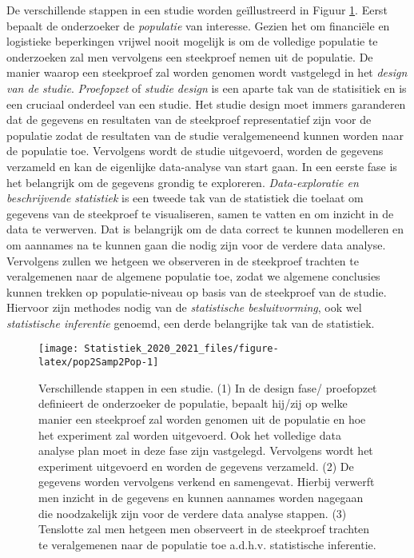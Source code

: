 \documentclass[
  12pt,dutch,coursenotes]{book}
\theoremstyle{definition}
\theoremstyle{definition}
\theoremstyle{definition}
\theoremstyle{remark}
\begin{document}
De verschillende stappen in een studie worden geïllustreerd in
Figuur \ref{fig:pop2Samp2Pop}.
Eerst bepaalt de onderzoeker de \emph{populatie} van interesse.
Gezien het om financiële en logistieke beperkingen vrijwel nooit mogelijk is om de volledige populatie te onderzoeken zal men vervolgens een steekproef nemen uit de populatie.
De manier waarop een steekproef zal worden genomen wordt vastgelegd in het \emph{design van de studie}.
\emph{Proefopzet} of \emph{studie design} is een aparte tak van de statisitiek en is een cruciaal onderdeel van een studie.
Het studie design moet immers garanderen dat de gegevens en resultaten van de steekproef representatief zijn voor de populatie zodat de resultaten van de studie veralgemeneend kunnen worden naar de populatie toe.
Vervolgens wordt de studie uitgevoerd, worden de gegevens verzameld en kan de eigenlijke data-analyse van start gaan.
In een eerste fase is het belangrijk om de gegevens grondig te exploreren.
\emph{Data-exploratie en beschrijvende statistiek} is een tweede tak van de statistiek die toelaat om gegevens van de steekproef te visualiseren, samen te vatten en om inzicht in de data te verwerven.
Dat is belangrijk om de data correct te kunnen modelleren en om aannames na te kunnen gaan die nodig zijn voor de verdere data analyse. Vervolgens zullen we hetgeen we observeren in de steekproef trachten te veralgemenen naar de algemene populatie toe, zodat we algemene conclusies kunnen trekken op populatie-niveau op basis van de steekproef van de studie. Hiervoor zijn methodes nodig van de \emph{statistische besluitvorming}, ook wel \emph{statistische inferentie} genoemd, een derde belangrijke tak van de statistiek.

\begin{figure}

{\centering \texttt{[image: Statistiek\_2020\_2021\_files/figure-latex/pop2Samp2Pop-1]} 

}

\caption{Verschillende stappen in een studie. (1) In de design fase/ proefopzet definieert de onderzoeker de populatie, bepaalt hij/zij op welke manier een steekproef zal worden genomen uit de populatie en hoe het experiment zal worden uitgevoerd. Ook het volledige data analyse plan moet in deze fase zijn vastgelegd. Vervolgens wordt het experiment uitgevoerd en worden de gegevens verzameld. (2) De gegevens worden vervolgens verkend en samengevat. Hierbij verwerft men inzicht in de gegevens en kunnen aannames worden nagegaan die noodzakelijk zijn voor de verdere data analyse stappen. (3) Tenslotte zal men hetgeen men observeert in de steekproef trachten te veralgemenen naar de populatie toe a.d.h.v. statistische inferentie.}\label{fig:pop2Samp2Pop}
\end{figure}
\end{document}
